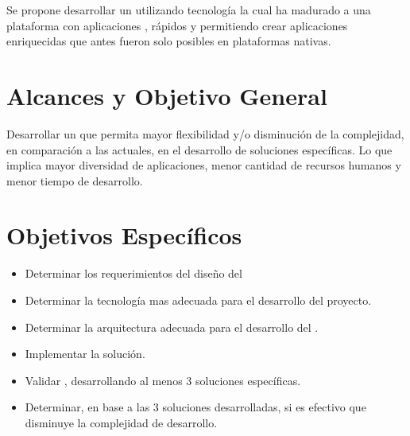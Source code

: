 
Se propone desarrollar un \framework utilizando tecnología \web la cual ha madurado a una plataforma con aplicaciones \fullfeatured, \javascript \runtime rápidos y \standard \htmlfive permitiendo crear aplicaciones enriquecidas que antes fueron solo posibles en plataformas nativas.



\section{Alcances y Objetivo General}\label{cap:intro:alcances}

Desarrollar un \framework \ecommerce que permita mayor flexibilidad y/o disminución de la complejidad, en comparación a las \frameworks actuales, en el desarrollo de soluciones específicas. Lo que implica mayor diversidad de aplicaciones, menor cantidad de recursos humanos y menor tiempo de desarrollo.

\section{Objetivos Específicos}\label{cap:intro:objetivos}
\begin{itemize}
	\item Determinar los requerimientos del diseño del \framework
	\item Determinar la tecnología mas adecuada para el desarrollo del proyecto.
	\item Determinar la arquitectura adecuada para el desarrollo del \framework.
	\item Implementar la solución.
	\item Validar \framework, desarrollando al menos 3 soluciones específicas.
	\item Determinar, en base a las 3 soluciones desarrolladas, si es efectivo que \framework disminuye la complejidad de desarrollo. 
\end{itemize}

%